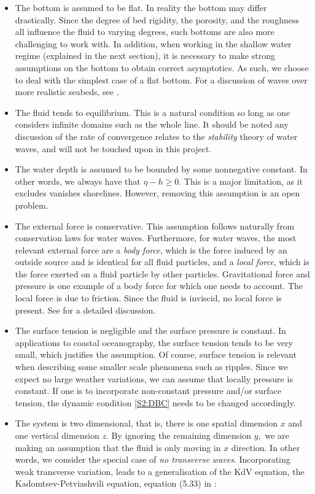 \begin{itemize}
\item The bottom is assumed to be flat. In reality the bottom may differ drastically. Since the degree of bed rigidity, the porosity, and the roughness all influence the fluid to varying degrees, such bottoms are also more challenging to work with. In addition, when working in the shallow water regime (explained in the next section), it is necessary to make strong assumptions on the bottom to obtain correct asymptotics. As such, we choose to deal with the simplest case of a flat bottom. For a discussion of waves over more realistic seabeds, see \cite[Chapter 9]{DD}.
\item The fluid tends to equilibrium. This is a natural condition so long as one considers infinite domains such as the whole line. It should be noted any discussion of the rate of convergence relates to the \textit{stability} theory of water waves, and will not be touched upon in this project.
\item The water depth is assumed to be bounded by some nonnegative constant. In other words, we always have that $\eta - h \geq 0.$ This is a major limitation, as it excludes vanishes shorelines. However, removing this assumption is an open problem.
\item The external force is conservative. This assumption follows naturally from conservation laws for water waves. Furthermore, for water waves, the most relevant external force are a \textit{body force}, which is the force induced by an outside source and is identical for all fluid particles, and a \textit{local force}, which is the force exerted on a fluid particle by other particles. Gravitational force and pressure is one example of a body force for which one needs to account. The local force is due to friction. Since the fluid is inviscid, no local force is present. See \cite[Chapter 4]{CK} for a detailed discussion.
\item The surface tension is negligible and the surface pressure is constant. In applications to coastal oceanography, the surface tension tends to be very small, which justifies the assumption. Of course, surface tension is relevant when describing some smaller scale phenomena such as ripples. Since we expect no large weather variations, we can assume that locally pressure is constant. If one is to incorporate non-constant pressure and/or surface tension, the dynamic condition \eqref{S2:DBC} needs to be changed accordingly.
\item The system is two dimensional, that is, there is one spatial dimension $x$ and one vertical dimension $z.$ By ignoring the remaining dimension $y,$ we are making an assumption that the fluid is only moving in $x$ direction. In other words, we consider the special case of \textit{no transverse waves}.  Incorporating weak transverse variation, leads to a generalisation of the KdV equation, the Kadomtsev-Petviashvili equation, equation (5.33) in \cite[Chapter 5]{Ablowitz}:

\end{itemize}
